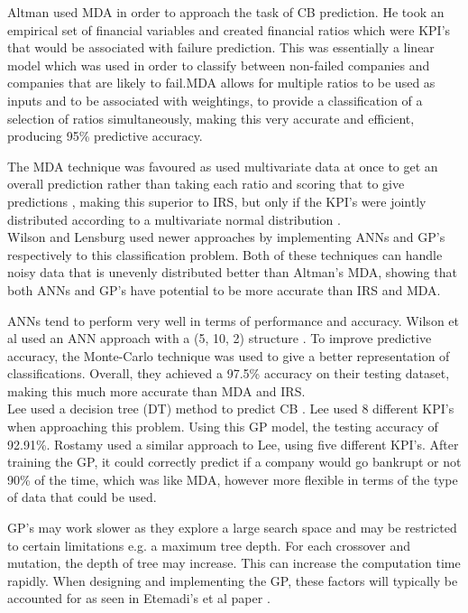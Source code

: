 \documentclass[11pt]{article}
\begin{document}
Altman used MDA in order to approach the task of CB prediction. He took an empirical set of financial variables and created financial ratios which were KPI's that would be associated with failure prediction. This was essentially a linear model which was used in order to classify between non-failed companies and companies that are likely to fail.MDA allows for multiple ratios to be used as inputs and to be associated with weightings, to provide a classification of a selection of ratios simultaneously, making this very accurate and efficient, producing 95\% predictive accuracy. 

The MDA technique was favoured as used multivariate data at once to get an overall prediction rather than taking each ratio and scoring that to give predictions \cite{?}, making this superior to IRS, but only if the KPI's were jointly distributed according to a multivariate normal distribution \cite{?}. \\
Wilson  \cite{?}and Lensburg \cite{?} used newer approaches by implementing ANNs and GP's respectively to this classification problem. Both of these techniques can handle noisy data that is unevenly distributed better than Altman's MDA, showing that both ANNs and GP's have potential to be more accurate than IRS and MDA. 

ANNs tend to perform very well in terms of performance and accuracy. Wilson et al used an ANN approach with a (5, 10, 2) structure \cite{?}. To improve predictive accuracy, the Monte-Carlo technique was used to give a better representation of classifications. Overall, they achieved a 97.5\% accuracy on their testing dataset, making this much more accurate than MDA and IRS. \\
Lee used a decision tree (DT) method to predict CB \cite{?}. Lee used 8 different KPI's when approaching this problem. Using this GP model, the testing accuracy of 92.91\%. Rostamy \cite{?} used a similar approach to Lee, using five different KPI's. After training the GP, it could correctly predict if a company would go bankrupt or not 90\% of the time, which was like MDA, however more flexible in terms of the type of data that could be used.

GP's may work slower as they explore a large search space and may be restricted to certain limitations e.g. a maximum tree depth. For each crossover and mutation, the depth of tree may increase. This can increase the computation time rapidly. When designing and implementing the GP, these factors will typically be accounted for as seen in Etemadi's et al paper \cite{?}. \\
\end{document}
